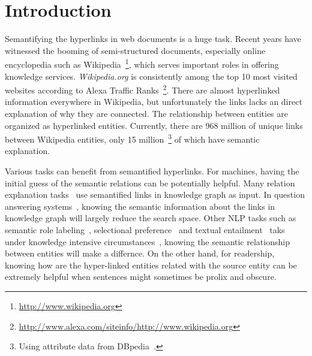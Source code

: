 \section{Introduction}


Semantifying the hyperlinks in web documents is a huge task.
Recent years have witnessed the booming of semi-structured documents, especially online encyclopedia such as  Wikipedia~\footnote{\small\url{http://www.wikipedia.org}}, which serves important roles in offering knowledge services.
{\it Wikipedia.org} is consistently among the top 10 most visited websites according to Alexa Traffic Ranks~\footnote{\small\url{http://www.alexa.com/siteinfo/http://www.wikipedia.org}}.
There are almost hyperlinked information everywhere in Wikipedia, but unfortunately the links lacks an direct explanation of why they are connected.
The relationship between entities are organized as hyperlinked entities. 
Currently, there are 968 million of unique links between Wikipedia entities, only 15 million~\footnote{Using attribute data from DBpedia~\cite{dbpedia}.} of which have semantic explanation.

Various tasks can benefit from semantified hyperlinks.
For machines, having the initial guess of the semantic relations can be potentially helpful.
Many relation explanation tasks~\cite{fang2011rex,nakashole2012discovering,voskarideslearning} use semantified links in knowledge graph as input.
In question answering systems~\cite{yang2014slq}, knowing the semantic information about the links in knowledge graph will largely reduce the search space.
Other NLP tasks such as semantic role labeling~\cite{palmer2010semantic}, selectional preference~\cite{pantel2007isp} and textual entailment~\cite{androutsopoulos2010survey} taks under knowledge intensive circumstances~\cite{yao2012unsupervised,exner2011using}, knowing the semantic relationship between entities will make a differnce.
On the other hand, for readership, knowing how are the hyper-linked entities related with the source entity can be extremely helpful when sentences might sometimes be prolix and obscure.

